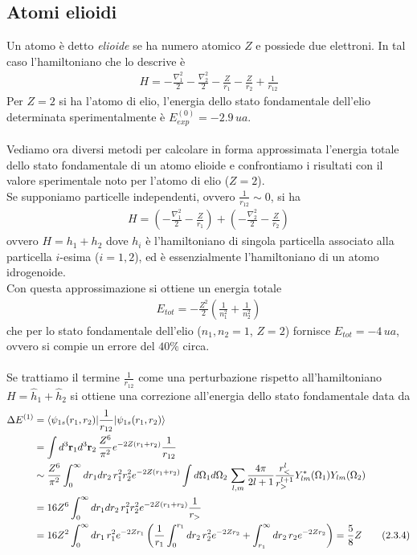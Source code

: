 \documentclass{article}
\begin{document}
\subsection{Atomi elioidi}
Un atomo è detto \textit{elioide} se ha numero atomico $Z$ e possiede due elettroni. In tal caso l'hamiltoniano che lo descrive è 
\begin{align}
    H = -\frac{\nabla^2_1}{2} - \frac{\nabla^2_2}{2} - \frac{Z}{r_1} - \frac{Z}{r_2} + \frac{1}{r_{12}} \tag{2.3.1}
\end{align}
Per $Z = 2$ si ha l'atomo di elio, l'energia dello stato fondamentale dell'elio determinata sperimentalmente è $E^{(0)}_{exp} = -2.9 \, ua$. \\ \\
Vediamo ora diversi metodi per calcolare in forma approssimata l'energia totale dello stato fondamentale di un atomo elioide e confrontiamo i risultati con il valore sperimentale noto per l'atomo di elio ($Z = 2$). \\
Se supponiamo particelle independenti, ovvero $\frac{1}{r_{12}} \sim 0$, si ha 
\begin{align}
    H = \left(-\frac{\nabla^2_1}{2} - \frac{Z}{r_1}\right) + \left(-\frac{\nabla^2_2}{2} - \frac{Z}{r_2}\right) \tag{2.3.2}
\end{align}
ovvero $H = h_1 + h_2$ dove $h_i$ è l'hamiltoniano di singola particella associato alla particella $i$-esima ($i = 1, 2$), ed è essenzialmente l'hamiltoniano di un atomo idrogenoide. \\
Con questa approssimazione si ottiene un energia totale 
\begin{align}
    E_{tot} = -\frac{Z^2}{2}\left(\frac{1}{n^2_1} + \frac{1}{n^2_2}\right) \tag{2.3.3}
\end{align}
che per lo stato fondamentale dell'elio ($n_1, n_2 = 1$, $Z = 2$) fornisce $E_{tot} = -4 \, ua$, ovvero si compie un errore del $40 \%$ circa. \\ \\
Se trattiamo il termine $\frac{1}{r_{12}}$ come una perturbazione rispetto all'hamiltoniano $H = \hat{h}_1 + \hat{h}_2$ si ottiene una correzione all'energia dello stato fondamentale data da 
\begin{align}
    \Delta E^{(1)} &= \braket{\psi_{1s}(r_1, r_2)|\frac{1}{r_{12}}|\psi_{1s}(r_1, r_2)} \notag \\
    &= \int d^3\mathbf{r}_1d^3\mathbf{r}_2 \, \frac{Z^6}{\pi^2}e^{-2Z(r_1 + r_2)}\frac{1}{r_{12}} \notag \\
    &\sim \frac{Z^6}{\pi^2}\int_0^\infty dr_1dr_2 \, r^2_1r^2_2 e^{-2Z(r_1 + r_2)}\int d\Omega_1d\Omega_2 \, \sum_{l, m}\frac{4\pi}{2l + 1}\frac{r^l_<}{r^{l + 1}_>}Y^*_{lm}(\Omega_1)Y_{lm}(\Omega_2) \notag \\
    &= 16Z^6 \int_0^\infty dr_1dr_2 \, r^2_1r^2_2e^{-2Z(r_1 + r_2)}\frac{1}{r_>} \notag \\
    &= 16Z^2\int_0^\infty dr_1 \, r^2_1e^{-2Zr_1}\left(\frac{1}{r_1}\int_0^{r_1} dr_2 \, r^2_2e^{-2Zr_2} + \int_{r_1}^\infty dr_2 \, r_2e^{-2Zr_2}\right) = \frac{5}{8}Z \tag{2.3.4}
\end{align}
\end{document}
